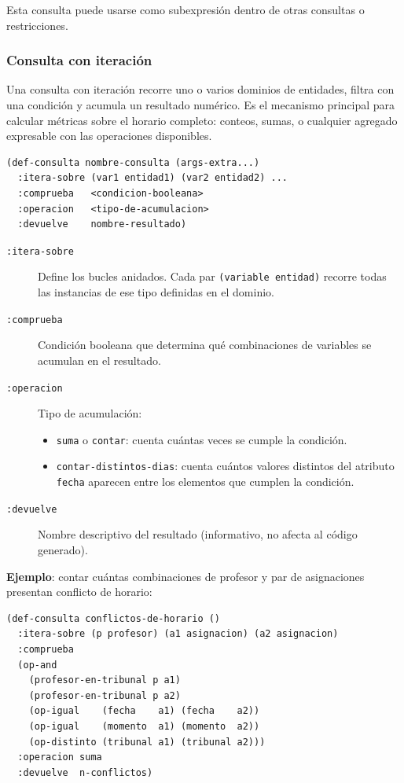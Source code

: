\documentclass[12pt,a4paper]{article}
\newcommand{\code}[1]{\texttt{#1}}
\begin{document}
Esta consulta puede usarse como subexpresión dentro de otras consultas
o restricciones.

\subsubsection{Consulta con iteración}

Una consulta con iteración recorre uno o varios dominios de entidades,
filtra con una condición y acumula un resultado numérico. Es el
mecanismo principal para calcular métricas sobre el horario completo:
conteos, sumas, o cualquier agregado expresable con las operaciones
disponibles.

\begin{lstlisting}[style=lisp, caption={Sintaxis de consulta con iteración}]
(def-consulta nombre-consulta (args-extra...)
  :itera-sobre (var1 entidad1) (var2 entidad2) ...
  :comprueba   <condicion-booleana>
  :operacion   <tipo-de-acumulacion>
  :devuelve    nombre-resultado)
\end{lstlisting}

\begin{description}
  \item[\code{:itera-sobre}] Define los bucles anidados. Cada par
    \code{(variable entidad)} recorre todas las instancias de ese tipo
    definidas en el dominio.
  \item[\code{:comprueba}] Condición booleana que determina qué
    combinaciones de variables se acumulan en el resultado.
  \item[\code{:operacion}] Tipo de acumulación:
    \begin{itemize}
      \item \code{suma} o \code{contar}: cuenta cuántas veces se cumple
            la condición.
      \item \code{contar-distintos-dias}: cuenta cuántos valores distintos
            del atributo \code{fecha} aparecen entre los elementos que
            cumplen la condición.
    \end{itemize}
  \item[\code{:devuelve}] Nombre descriptivo del resultado (informativo,
    no afecta al código generado).
\end{description}

\textbf{Ejemplo}: contar cuántas combinaciones de profesor y par de
asignaciones presentan conflicto de horario:

\begin{lstlisting}[style=lisp, caption={Consulta con iteración: conflictos de horario}]
(def-consulta conflictos-de-horario ()
  :itera-sobre (p profesor) (a1 asignacion) (a2 asignacion)
  :comprueba
  (op-and
    (profesor-en-tribunal p a1)
    (profesor-en-tribunal p a2)
    (op-igual    (fecha    a1) (fecha    a2))
    (op-igual    (momento  a1) (momento  a2))
    (op-distinto (tribunal a1) (tribunal a2)))
  :operacion suma
  :devuelve  n-conflictos)
\end{lstlisting}
\end{document}
